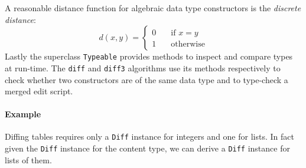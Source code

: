 \documentclass{sigplanconf}
\theoremstyle{plain}
\newtheorem{definition}{Definition}
\begin{document}

A reasonable distance function for algebraic
data type constructors is the \emph{discrete distance}:
	\[ d(x, y) = 
		\begin{cases} 
			0 \quad &\mbox{if } x = y \\
			1 \quad &\mbox {otherwise}		
		\end{cases} \]	
%
Lastly the superclass \texttt{Typeable} provides methods to inspect and
compare types at run-time.
The \texttt{diff} and \texttt{diff3} algorithms use its methods respectively 
to check whether two constructors are of the same data type
and to type-check a merged edit script.

\paragraph{Example}
Diffing tables requires only a \texttt{Diff} instance for integers
and one for lists.
In fact given the \texttt{Diff} instance for the content type, we can
derive a \texttt{Diff} instance for lists of them.
\end{document}
